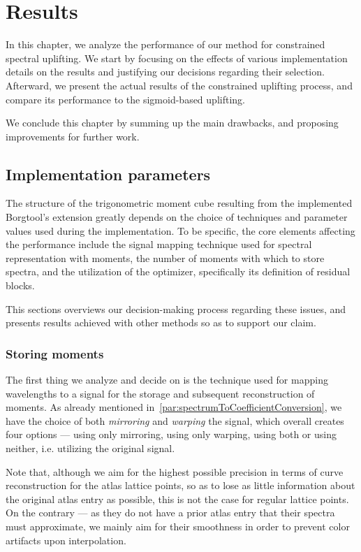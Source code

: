 \chapter{Results} \label{chap:results}

In this chapter, we analyze the performance of our method for constrained spectral uplifting. We start by focusing on the effects of various implementation details on the results and justifying our decisions regarding their selection. Afterward, we present the actual results of the constrained uplifting process, and compare its performance to the sigmoid-based uplifting.

We conclude this chapter by summing up the main drawbacks, and proposing improvements for further work.

\section{Implementation parameters}

The structure of the trigonometric moment cube resulting from the implemented Borgtool's extension greatly depends on the choice of techniques and parameter values used during the implementation. To be specific, the core elements affecting the performance include the signal mapping technique used for spectral representation with moments, the number of moments with which to store spectra, and the utilization of the optimizer, specifically its definition of residual blocks.

This sections overviews our decision-making process regarding these issues, and presents results achieved with other methods so as to support our claim.

\subsection{Storing moments} \label{sec:storingMoments}

The first thing we analyze and decide on is the technique used for mapping wavelengths to a signal for the storage and subsequent reconstruction of moments. As already mentioned in~\cref{par:spectrumToCoefficientConversion}, we have the choice of both \emph{mirroring} and \emph{warping} the signal, which overall creates four options --- using only mirroring, using only warping, using both or using neither, i.e. utilizing the original signal.

Note that, although we aim for the highest possible precision in terms of curve reconstruction for the atlas lattice points, so as to lose as little information about the original atlas entry as possible, this is not the case for regular lattice points. On the contrary --- as they do not have a prior atlas entry that their spectra must approximate, we mainly aim for their smoothness in order to prevent color artifacts upon interpolation.

